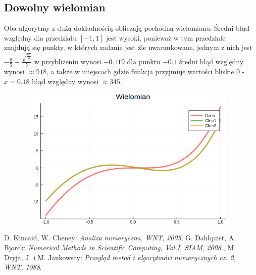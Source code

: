 \documentclass{article}
\begin{document}
\subsection{Dowolny wielomian}
\indent Oba algorytmy z dużą dokładnością obliczają pochodną wielomianu. Średni błąd względny dla przedziału $[-1, 1]$ jest wysoki, ponieważ w tym przedziale znajdują się punkty, w których zadanie jest źle uwarunkowane, jednym z nich jest $-\frac{6}{5} + \frac{\sqrt{\frac{87}{2}}}{5}$ w przybliżeniu wynosi $-0.119$ dla punktu $-0.1$ średni błąd względny wynosi $\approx 918$, a także w miejscach gdzie funkcja przyjmuje wartości bliskie 0 - $x = 0.18$ błąd względny wynosi $\approx 345$.
\begin{figure}[h]
\centering
\includegraphics[width=12cm,height=7cm]{wykreswiel.png}
\end{figure}
\begin{thebibliography}{99}
\bibitem{} D. Kincaid, W. Cheney:
\emph{Analiza numeryczna, WNT, 2005},
\bibitem{} G. Dahlquist, A. Bjorck:
\emph{Numerical Methods in Scientific Computing, Vol.I, SIAM, 2008.},
\bibitem{} M. Dryja, J. i M. Jankowscy:
\emph{Przegląd metod i algorytmów numerycznych cz. 2, WNT, 1988},

\end{thebibliography}
\end{document}
